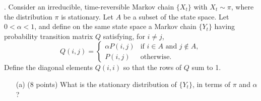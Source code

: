 \documentclass{article}
\begin{document}
. Consider an irreducible, time-reversible Markov chain $\{X_t\}$ with $X_t \sim \pi$, where the distribution $\pi$ is stationary. Let $A$ be a subset of the state space. Let $0 < \alpha < 1$, and define on the same state space a Markov chain $\{Y_t\}$ having probability transition matrix $Q$ satisfying, for $i \neq j$,
\[
Q(i,j) =
\begin{cases}
\alpha P(i,j) & \text{if } i \in A \text{ and } j \notin A, \\
P(i,j) & \text{otherwise}.
\end{cases}
\]
Define the diagonal elements $Q(i,i)$ so that the rows of $Q$ sum to 1.
\begin{itemize}
    \item[(a)] (8 points) What is the stationary distribution of $\{Y_t\}$, in terms of $\pi$ and $\alpha$?


\end{itemize}
\end{document}
